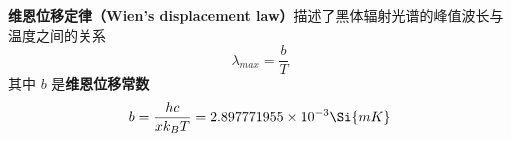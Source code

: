
\textbf{维恩位移定律（Wien's displacement law）}描述了黑体辐射光谱的峰值波长与温度之间的关系
\begin{equation}
\lambda_{max} = \frac{b}{T}
\end{equation}
其中 $b$ 是\textbf{维恩位移常数}
\begin{equation}
b = \frac{hc}{xk_B T} = 2.897771955\times 10^{-3} \Si{mK}
\end{equation}
